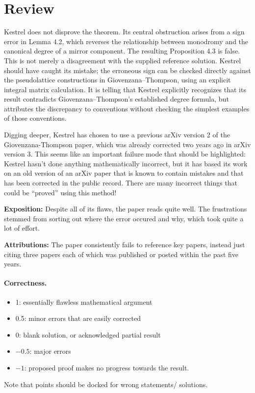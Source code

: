 \documentclass[11pt]{article}
\theoremstyle{definition}
\theoremstyle{remark}
\begin{document}
\maketitle

\section{Review}
{\color{gray}

Kestrel does not disprove the theorem. Its central obstruction arises from a sign error in Lemma 4.2, which reverses the relationship between monodromy and the canonical degree of a mirror component. The resulting Proposition 4.3 is false.  This is not merely a disagreement with the supplied reference solution. Kestrel should have caught its mistake; the erroneous sign can be checked directly against the pseudolattice constructions in Giovenzana–Thompson, using an explicit integral matrix calculation. It is telling that Kestrel explicitly recognizes that its result contradicts Giovenzana–Thompson’s established degree formula, but attributes the discrepancy to conventions without checking the simplest examples of those conventions.

Digging deeper, Kestrel has chosen to use a previous arXiv version 2 of the Giovenzana-Thompson paper, which was already corrected two years ago in arXiv version 3.  This seems like an important failure mode that should be highlighted: Kestrel hasn’t done anything mathematically incorrect, but it has based its work on an old version of an arXiv paper that is known to contain mistakes and that has been corrected in the public record. There are many incorrect things that could be ``proved'' using this method! \vspace{.125in}

\noindent
{\bf Exposition:}  Despite all of its flaws, the paper reads quite well. The frustrations stemmed from sorting out where the error occured and why, which took quite a lot of effort. \vspace{.125in}

\noindent
{\bf Attributions:}  The paper consistently fails to reference key papers, instead just citing three papers each of which was published or posted within the past five years.


}


\paragraph{Correctness.}
\begin{itemize}
	\item  1: essentially flawless mathematical argument
	\item  0.5: minor errors that are easily corrected
	\item  0: blank solution, or acknowledged partial result
	\item  $-0.5$: major errors
	\item  $-1$: proposed proof makes no progress towards the result.
\end{itemize}
Note that points should be docked for wrong statements/ solutions.
\end{document}
